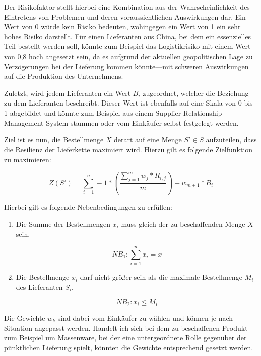 Der Risikofaktor stellt hierbei eine Kombination aus der Wahrscheinlichkeit des Eintretens von Problemen und deren voraussichtlichen Auswirkungen dar.
Ein Wert von 0 würde kein Risiko bedeuten, wohingegen ein Wert von 1 ein sehr hohes Risiko darstellt.
Für einen Lieferanten aus China, bei dem ein essenzielles Teil bestellt werden soll, könnte zum Beispiel das Logistikrisiko mit einem Wert von 0,8 hoch angesetzt sein, da es aufgrund der aktuellen geopolitischen Lage zu Verzögerungen bei der Lieferung kommen könnte---mit schweren Auswirkungen auf die Produktion des Unternehmens.

Zuletzt, wird jedem Lieferanten ein Wert $B_i$ zugeordnet, welcher die Beziehung zu dem Lieferanten beschreibt.
Dieser Wert ist ebenfalls auf eine Skala von 0 bis 1 abgebildet und könnte zum Beispiel aus einem Supplier Relationship Management System stammen oder vom Einkäufer selbst festgelegt werden.

Ziel ist es nun, die Bestellmenge $X$ derart auf eine Menge $S' \in S$ aufzuteilen, dass die Resilienz der Lieferkette maximiert wird.
Hierzu gilt es folgende Zielfunktion zu maximieren:

\begin{equation*}
  Z(S') = \sum_{i=1}^n -1 * \left( \frac{\sum_{j=1}^m w_j * R_{i,j}}{m} \right) + w_{m+1} * B_i
\end{equation*}

Hierbei gilt es folgende Nebenbedingungen zu erfüllen:

\begin{enumerate}
  \item Die Summe der Bestellmengen $x_i$ muss gleich der zu beschaffenden Menge $X$ sein.
  
  \begin{equation*}
    NB_1 : \sum_{i=1}^n x_i = x
  \end{equation*}

  \item Die Bestellmenge $x_i$ darf nicht größer sein als die maximale Bestellmenge $M_i$ des Lieferanten $S_i$.
  
  \begin{equation*}
    NB_2 : x_i \leq M_i
  \end{equation*}
\end{enumerate}

Die Gewichte $w_k$ sind dabei vom Einkäufer zu wählen und können je nach Situation angepasst werden.
Handelt ich sich bei dem zu beschaffenen Produkt zum Beispiel um Massenware, bei der eine untergeordnete Rolle gegenüber der pünktlichen Lieferung spielt, könnten die Gewichte entsprechend gesetzt werden.

